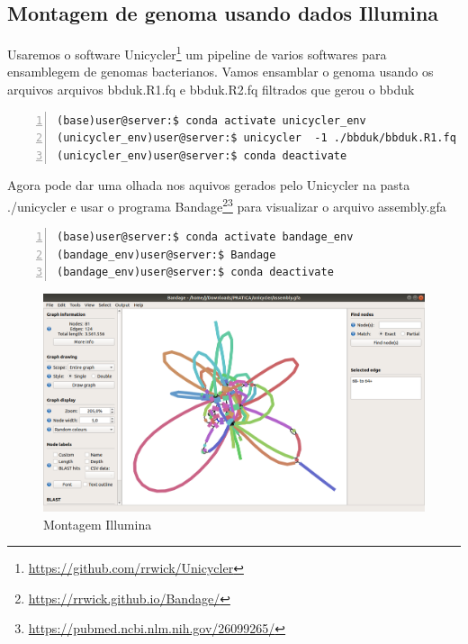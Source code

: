 \documentclass[letter,11pt]{book}
\begin{document}
\subsection{Montagem de genoma usando dados Illumina}
Usaremos o software Unicycler\footnote{\url{https://github.com/rrwick/Unicycler}} um pipeline de varios softwares para ensamblegem de genomas bacterianos. Vamos ensamblar o genoma usando os arquivos arquivos bbduk.R1.fq e bbduk.R2.fq filtrados que gerou o bbduk

\begin{Verbatim}[commandchars=!\{\}, numbers=left,label= Montando leituras com Unicycler,frame=topline,fontsize=\scriptsize]
(base)user@server:$ conda activate unicycler_env
(unicycler_env)user@server:$ unicycler  -1 ./bbduk/bbduk.R1.fq -2 ./bbduk/bbduk.R2.fq -o ./unicycler/
(unicycler_env)user@server:$ conda deactivate
\end{Verbatim}

Agora pode dar uma olhada nos aquivos gerados pelo Unicycler na pasta ./unicycler e usar o programa Bandage\footnote{\url{https://rrwick.github.io/Bandage/}}\footnote{\url{https://pubmed.ncbi.nlm.nih.gov/26099265/}} para visualizar o arquivo assembly.gfa


\begin{Verbatim}[commandchars=!\{\}, numbers=left,label= Abrindo o Bandage,frame=topline,fontsize=\scriptsize]
(base)user@server:$ conda activate bandage_env 
(bandage_env)user@server:$ Bandage
(bandage_env)user@server:$ conda deactivate
\end{Verbatim}

\begin{figure}[ht]
\centering
   \includegraphics[width=12cm]{Figs/bandage.png}
  \caption[Visualização da montagem do unicycler]{\label{bandage}Montagem Illumina}
\end{figure}
\end{document}
